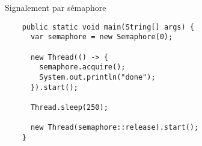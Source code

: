 
\begingroup

\begin{frame}[fragile]{Signalement par sémaphore}
  \begin{lstlisting}
    public static void main(String[] args) {
      var semaphore = new Semaphore(0);
      
      new Thread(() -> {
        semaphore.acquire();
        System.out.println("done");
      }).start();
      
      Thread.sleep(250);
      
      new Thread(semaphore::release).start();
    }
  \end{lstlisting}
\end{frame}

\endgroup
\endinput
